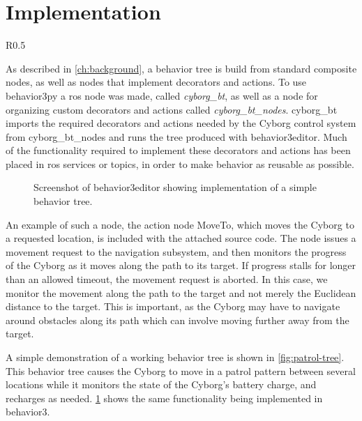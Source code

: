 \documentclass[\rootfolder/main.tex]{subfiles}
\begin{document}

\section{Implementation}

\begin{wrapfigure}{R}{0.5\columnwidth}
    \caption{Behavior tree that checks battery state, and charges if necessary, while patrolling.}
    \label{fig:patrol-tree}
\end{wrapfigure}

As described in \cref{ch:background}, a behavior tree is build from standard composite nodes, as well as nodes that implement decorators and actions.
To use behavior3py a \acrshort{ros} node was made, called \emph{cyborg\_bt}, as well as a node for organizing custom decorators and actions called \emph{cyborg\_bt\_nodes}.
cyborg\_bt imports the required decorators and actions needed by the Cyborg control system from cyborg\_bt\_nodes and runs the tree produced with behavior3editor.
Much of the functionality required to implement these decorators and actions has been placed in \acrshort{ros} services or topics, in order to make behavior as reusable as possible.

\begin{figure}[h]
    \caption{Screenshot of behavior3editor showing implementation of a simple behavior tree.}
    \label{fig:b3editor}
\end{figure}

An example of such a node, the action node MoveTo, which moves the Cyborg to a requested location, is included with the attached source code.
The node issues a movement request to the navigation subsystem, and then monitors the progress of the Cyborg as it moves along the path to its target.
If progress stalls for longer than an allowed timeout, the movement request is aborted.
In this case, we monitor the movement along the path to the target and not merely the Euclidean distance to the target.
This is important, as the Cyborg may have to navigate around obstacles along its path which can involve moving further away from the target.

A simple demonstration of a working behavior tree is shown in \cref{fig:patrol-tree}.
This behavior tree causes the Cyborg to move in a patrol pattern between several locations while it monitors the state of the Cyborg's battery charge, and recharges as needed.
\cref{fig:b3editor} shows the same functionality being implemented in behavior3.
\end{document}
